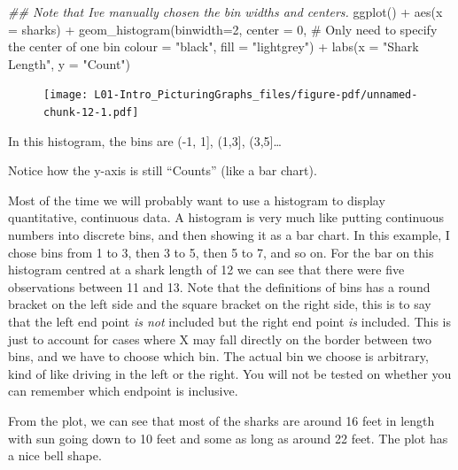 \documentclass[
  letterpaper,
  DIV=11,
  numbers=noendperiod,
  oneside]{scrreprt}
\newenvironment{Shaded}{\begin{snugshade}}{\end{snugshade}}
\newcommand{\AttributeTok}[1]{\textcolor[rgb]{0.40,0.45,0.13}{#1}}
\newcommand{\CommentTok}[1]{\textcolor[rgb]{0.37,0.37,0.37}{#1}}
\newcommand{\DecValTok}[1]{\textcolor[rgb]{0.68,0.00,0.00}{#1}}
\newcommand{\DocumentationTok}[1]{\textcolor[rgb]{0.37,0.37,0.37}{\textit{#1}}}
\newcommand{\FunctionTok}[1]{\textcolor[rgb]{0.28,0.35,0.67}{#1}}
\newcommand{\NormalTok}[1]{\textcolor[rgb]{0.00,0.23,0.31}{#1}}
\newcommand{\SpecialCharTok}[1]{\textcolor[rgb]{0.37,0.37,0.37}{#1}}
\newcommand{\StringTok}[1]{\textcolor[rgb]{0.13,0.47,0.30}{#1}}
\begin{document}
\begin{Shaded}
\begin{Highlighting}[]
\DocumentationTok{\#\# Note that I\textquotesingle{}ve manually chosen the bin widths and centers.}
\FunctionTok{ggplot}\NormalTok{() }\SpecialCharTok{+} 
    \FunctionTok{aes}\NormalTok{(}\AttributeTok{x =}\NormalTok{ sharks) }\SpecialCharTok{+}
    \FunctionTok{geom\_histogram}\NormalTok{(}\AttributeTok{binwidth=}\DecValTok{2}\NormalTok{, }
        \AttributeTok{center =} \DecValTok{0}\NormalTok{, }\CommentTok{\# Only need to specify the center of one bin}
        \AttributeTok{colour =} \StringTok{"black"}\NormalTok{, }\AttributeTok{fill =} \StringTok{"lightgrey"}\NormalTok{) }\SpecialCharTok{+}
    \FunctionTok{labs}\NormalTok{(}\AttributeTok{x =} \StringTok{"Shark Length"}\NormalTok{, }\AttributeTok{y =} \StringTok{"Count"}\NormalTok{)}
\end{Highlighting}
\end{Shaded}

\begin{figure}[H]

{\centering \texttt{[image: L01-Intro\_PicturingGraphs\_files/figure-pdf/unnamed-chunk-12-1.pdf]}

}

\end{figure}

In this histogram, the bins are (-1, 1{]}, (1,3{]}, (3,5{]}\ldots{}

Notice how the y-axis is still ``Counts'' (like a bar chart).

Most of the time we will probably want to use a histogram to display
quantitative, continuous data. A histogram is very much like putting
continuous numbers into discrete bins, and then showing it as a bar
chart. In this example, I chose bins from 1 to 3, then 3 to 5, then 5 to
7, and so on. For the bar on this histogram centred at a shark length of
12 we can see that there were five observations between 11 and 13. Note
that the definitions of bins has a round bracket on the left side and
the square bracket on the right side, this is to say that the left end
point \emph{is not} included but the right end point \emph{is} included.
This is just to account for cases where X may fall directly on the
border between two bins, and we have to choose which bin. The actual bin
we choose is arbitrary, kind of like driving in the left or the right.
You will not be tested on whether you can remember which endpoint is
inclusive.

From the plot, we can see that most of the sharks are around 16 feet in
length with sun going down to 10 feet and some as long as around 22
feet. The plot has a nice bell shape.
\end{document}
